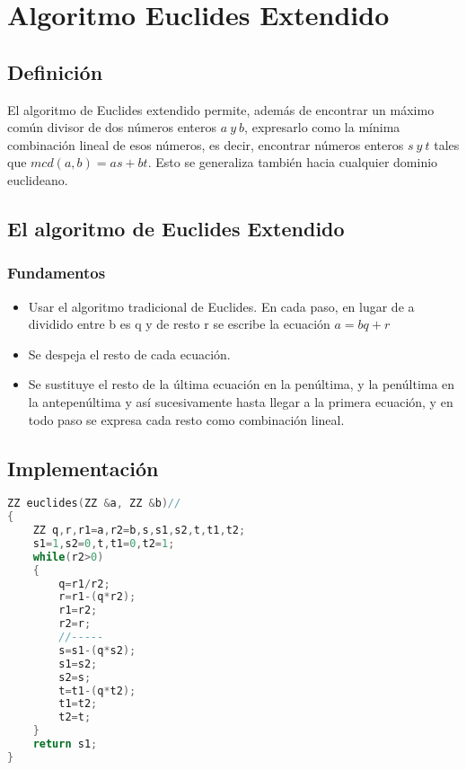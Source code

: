 \chapter{Algoritmo Euclides Extendido}
\section{Definición}
El algoritmo de Euclides extendido permite, además de encontrar un máximo común divisor de dos números enteros  $a\: y\: b$, expresarlo como la mínima combinación lineal de esos números, es decir, encontrar números enteros $s\: y\: t$ tales que $mcd(a,b)=as+bt$. Esto se generaliza también hacia cualquier dominio euclideano.
\section{El algoritmo de Euclides Extendido}
\subsection{Fundamentos}
\begin{itemize}
 \item Usar el algoritmo tradicional de Euclides. En cada paso, en lugar de a dividido entre b es q y de resto r se escribe la ecuación $a = b q + r$
 \item Se despeja el resto de cada ecuación.
 \item Se sustituye el resto de la última ecuación en la penúltima, y la penúltima en la antepenúltima y así sucesivamente hasta llegar a la primera ecuación, y en todo paso se expresa cada resto como combinación lineal.
\end{itemize}
\section{Implementación}
\begin{lstlisting}[language=C++]
ZZ euclides(ZZ &a, ZZ &b)//
{
    ZZ q,r,r1=a,r2=b,s,s1,s2,t,t1,t2;
    s1=1,s2=0,t,t1=0,t2=1;
    while(r2>0)
    {
        q=r1/r2;
        r=r1-(q*r2);
        r1=r2;
        r2=r;
        //-----
        s=s1-(q*s2);
        s1=s2;
        s2=s;
        t=t1-(q*t2);
        t1=t2;
        t2=t;
    }
    return s1;
}
\end{lstlisting}
